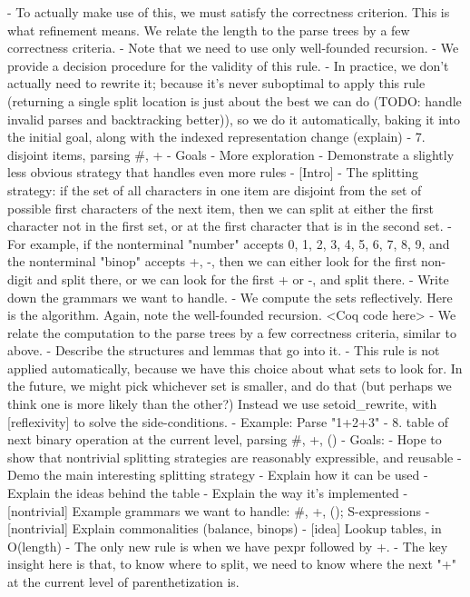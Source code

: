    - To actually make use of this, we must satisfy the correctness criterion.  This is what refinement means.  We relate the length to the parse trees by a few correctness criteria.
      - Note that we need to use only well-founded recursion.
    - We provide a decision procedure for the validity of this rule.
  - In practice, we don't actually need to rewrite it; because it's never suboptimal to apply this rule (returning a single split location is just about the best we can do (TODO: handle invalid parses and backtracking better)), so we do it automatically, baking it into the initial goal, along with the indexed representation change (explain)
- 7. disjoint items, parsing #, +
  - Goals
    - More exploration
    - Demonstrate a slightly less obvious strategy that handles even more rules
  - [Intro]
  - The splitting strategy: if the set of all characters in one item are disjoint from the set of possible first characters of the next item, then we can split at either the first character not in the first set, or at the first character that is in the second set.
    - For example, if the nonterminal "number" accepts {0, 1, 2, 3, 4, 5, 6, 7, 8, 9}, and the nonterminal "binop" accepts {+, -}, then we can either look for the first non-digit and split there, or we can look for the first + or -, and split there.
  - Write down the grammars we want to handle.
  - We compute the sets reflectively.  Here is the algorithm.  Again, note the well-founded recursion.  <Coq code here>
  - We relate the computation to the parse trees by a few correctness criteria, similar to above.
    - Describe the structures and lemmas that go into it.
  - This rule is not applied automatically, because we have this choice about what sets to look for.  In the future, we might pick whichever set is smaller, and do that (but perhaps we think one is more likely than the other?)  Instead we use setoid_rewrite, with [reflexivity] to solve the side-conditions.
  - Example: Parse "1+2+3"
- 8. table of next binary operation at the current level, parsing #, +, ()
  - Goals:
    - Hope to show that nontrivial splitting strategies are reasonably expressible, and reusable
    - Demo the main interesting splitting strategy
      - Explain how it can be used
      - Explain the ideas behind the table
      - Explain the way it's implemented
  - [nontrivial] Example grammars we want to handle: #, +, (); S-expressions
  - [nontrivial] Explain commonalities (balance, binops)
  - [idea] Lookup tables, in O(length)
    - The only new rule is when we have pexpr followed by +.
    - The key insight here is that, to know where to split, we need to know where the next "+" at the current level of parenthetization is.
